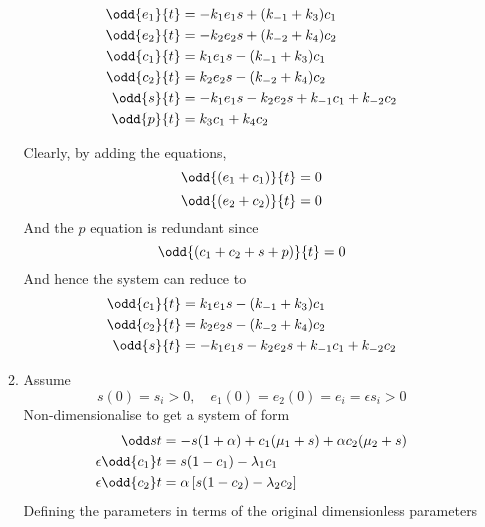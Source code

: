 \documentclass{X:/Documents/Coding/Latex/myassignment}
\begin{document}
\begin{enumerate}
\begin{enumerate}
		\begin{align*}
			\odd{e_1}{t} &=- k_1e_1s  + (k_{-1}+k_3)c_1\\
			\odd{e_2}{t} &=- k_2e_2s  + (k_{-2}+k_4)c_2\\
			\odd{c_1}{t} &= k_1e_1s -  (k_{-1}+k_3)c_1\\
			\odd{c_2}{t} &=k_2e_2s  - (k_{-2}+k_4)c_2\\
			\odd{s}{t} &= -k_1e_1s -k_2e_2 s + k_{-1}c_1 + k_{-2} c_2\\
			\odd{p}{t} &= k_3c_1 + k_4 c_2
		\end{align*}

		Clearly, by adding the equations,
		\[\odd{(e_1 + c_1)}{t} = 0\]
		\[\odd{(e_2 + c_2)}{t} = 0\]
		And the $p$ equation is redundant since
		\[\odd{(c_1+c_2+s+p)}{t} = 0\]
		And hence the system can reduce to 
		\begin{align*}
			\odd{c_1}{t} &= k_1e_1s -  (k_{-1}+k_3)c_1\\
			\odd{c_2}{t} &=k_2e_2s  - (k_{-2}+k_4)c_2\\
			\odd{s}{t} &= -k_1e_1s -k_2e_2 s + k_{-1}c_1 + k_{-2} c_2\\
		\end{align*}
		\item Assume
		\[s(0) = s_i > 0,\quad e_1(0) = e_2(0) = e_i = \epsilon s_i > 0\]
		Non-dimensionalise to get a system of form
		\begin{align*}
			\odd st &= -s (1+\alpha) + c_1 (\mu_1 + s) + \alpha c_2 ( \mu_2 + s)\\
			\epsilon \odd{c_1}t &= s(1-c_1) - \lambda_1 c_1\\
			\epsilon \odd{c_2}t &= \alpha \left[ s (1- c_2) - \lambda_2 c_2\right]
		\end{align*}
		Defining the parameters in terms of the original dimensionless parameters




\end{enumerate}
\end{enumerate}
\end{document}
